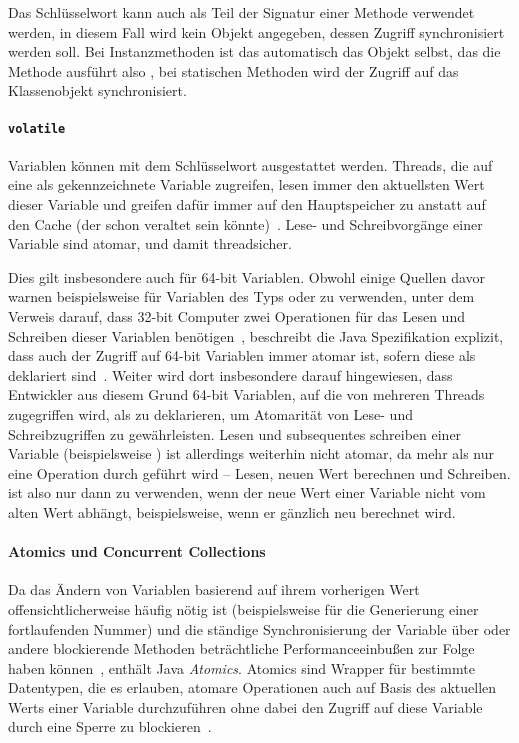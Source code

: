 Das Schlüsselwort  kann auch als Teil der Signatur einer Methode verwendet werden, in diesem Fall wird kein Objekt angegeben, dessen Zugriff synchronisiert werden soll. Bei Instanzmethoden ist das automatisch das Objekt selbst, das die Methode ausführt also , bei statischen Methoden wird der Zugriff auf das Klassenobjekt synchronisiert.

\paragraph{\texttt{volatile}} Variablen können mit dem Schlüsselwort  ausgestattet werden. Threads, die auf eine als  gekennzeichnete Variable zugreifen, lesen immer den aktuellsten Wert dieser Variable und greifen dafür immer auf den Hauptspeicher zu anstatt auf den Cache (der schon veraltet sein könnte)~\cite[S.~30~ff.]{Friesen2015}. Lese- und Schreibvorgänge einer  Variable sind atomar, und damit threadsicher.

Dies gilt insbesondere auch für 64-bit Variablen. Obwohl einige Quellen davor warnen beispielsweise  für Variablen des Typs  oder  zu verwenden, unter dem Verweis darauf, dass 32-bit Computer zwei Operationen für das Lesen und Schreiben dieser Variablen benötigen~\cite[S.~34]{Friesen2015}, beschreibt die Java Spezifikation explizit, dass auch der Zugriff auf 64-bit Variablen immer atomar ist, sofern diese als  deklariert sind~\cite{Java7Spec17}. Weiter wird dort insbesondere darauf hingewiesen, dass Entwickler aus diesem Grund 64-bit Variablen, auf die von mehreren Threads zugegriffen wird, als  zu deklarieren, um Atomarität von Lese- und Schreibzugriffen zu gewährleisten. Lesen und subsequentes schreiben einer  Variable (beispielsweise ) ist allerdings weiterhin nicht atomar, da mehr als nur eine Operation durch geführt wird -- Lesen, neuen Wert berechnen und Schreiben.  ist also nur dann zu verwenden, wenn der neue Wert einer Variable nicht vom alten Wert abhängt, beispielsweise, wenn er gänzlich neu berechnet wird. 

\paragraph{Atomics und Concurrent Collections} Da das Ändern von Variablen basierend auf ihrem vorherigen Wert offensichtlicherweise häufig nötig ist (beispielsweise für die Generierung einer fortlaufenden Nummer) und die ständige Synchronisierung der Variable über  oder andere blockierende Methoden beträchtliche Performanceeinbußen zur Folge haben können~\cite[S.~130]{Friesen2015}, enthält Java \emph{Atomics}. Atomics sind Wrapper für bestimmte Datentypen, die es erlauben, atomare Operationen auch auf Basis des aktuellen Werts einer Variable durchzuführen ohne dabei den Zugriff auf diese Variable durch eine Sperre zu blockieren~\cite[S.~130]{Friesen2015}. 

